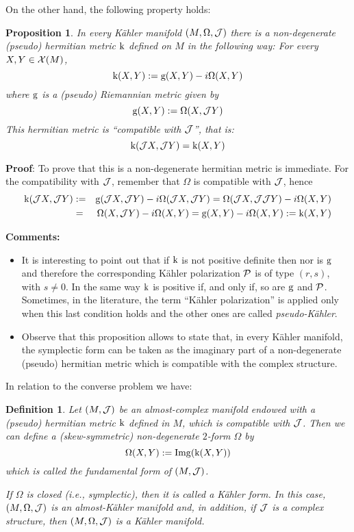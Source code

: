 \documentclass[12pt]{article}
\newtheorem{prop}{Proposition}
\newtheorem{definition}{Definition}
\def\beann{\begin{eqnarray*}}
\def\eeann{\end{eqnarray*}}
\def\qed{\ifvmode\removelastskip\fi
{\unskip\nobreak\hfil\penalty50\hbox{}\nobreak\hfil
\hbox{\vrule height1.2ex width1.2ex}\parfillskip=0pt
\finalhyphendemerits=0 \par\smallskip}}
\def\P{{\cal P}}
\begin{document}
On the other hand, the following property holds:

\begin{prop}
In every K\"ahler manifold $(M,\Omega ,{\cal J})$
there is a non-degenerate (pseudo) hermitian metric ${\rm k}$
defined on $M$ in the following way:
For every $X,Y \in {\cal X}(M)$,
$$
{\rm k} (X,Y) := {\rm g}(X,Y) - i\Omega (X,Y)
$$
where ${\rm g}$ is a (pseudo) Riemannian metric given by
$$
{\rm g}(X,Y) := \Omega (X,{\cal J}Y)
$$
This hermitian metric is ``compatible with ${\cal J}$'',
that is:
$$
{\rm k} ({\cal J}X,{\cal J}Y) = {\rm k} (X,Y)
$$
\end{prop}
{\bf Proof}: 
To prove that this is a non-degenerate hermitian metric is immediate.
For the compatibility with ${\cal J}$, remember that
$\Omega$ is compatible with ${\cal J}$, hence
\beann
{\rm k} ({\cal J}X,{\cal J}Y)&:=&
{\rm g}({\cal J}X,{\cal J}Y) - i\Omega ({\cal J}X,{\cal J}Y)
=\Omega ({\cal J}X,{\cal J}{\cal J}Y) - i\Omega (X,Y)
\\ &=&
\Omega (X,{\cal J}Y) - i\Omega (X,Y)
={\rm g}(X,Y) - i\Omega (X,Y) := {\rm k} (X,Y)
\eeann
\qed
{\bf Comments:}
\begin{itemize}
\item
It is interesting to point out that if ${\rm k}$ is not positive
definite
then nor is $\rm g$ and therefore the corresponding K\"ahler
polarization $\P$
is of type $(r,s)$, with $s\not=0$.
In the same way ${\rm k}$ is positive if, and only if, so are ${\rm g}$
and $\P$.
Sometimes, in the literature, the term ``K\"ahler polarization''
is applied only when this last condition holds and the
other ones are called {\it pseudo-K\"ahler}.
\item
Observe that this proposition allows to state that,
in every K\"ahler manifold,
the symplectic form can be taken as the imaginary part of a
non-degenerate (pseudo) hermitian metric
which is compatible with the complex structure.
\end{itemize}

In relation to the converse problem we have:

\begin{definition}
Let $(M,{\cal J})$ be an almost-complex manifold endowed
with a (pseudo) hermitian metric ${\rm k}$ defined in $M$,
which is compatible with ${\cal J}$.
Then we can define a (skew-symmetric) non-degenerate
$2$-form $\Omega$ by
$$
\Omega (X,Y) :={\rm Img} ({\rm k} (X,Y))
$$
which is called the
{\rm fundamental form} of $(M,{\cal J})$.

If $\Omega$ is closed (i.e., symplectic),
then it is called a {\rm K\"ahler form}.
In this case, $(M,\Omega ,{\cal J})$ is an almost-K\"ahler manifold
and, in addition, if ${\cal J}$ is a complex structure,
then $(M,\Omega ,{\cal J})$ is a K\"ahler manifold.
\end{definition}
\end{document}
